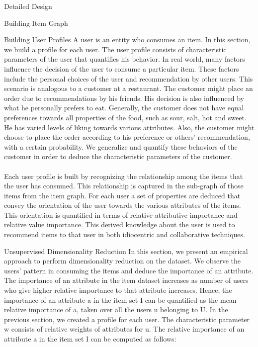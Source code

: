 \documentclass{report}
\begin{document}
\begin{projChapter}{Detailed Design}
\begin{projSection}{Building Item Graph}
\end{projSection}
\begin{projSection}{Building User Profiles}
            A user is an entity who consumes an item. In this section, we build a profile for each user. The user profile consists of characteristic parameters of the user that quantifies his behavior. In real world, many factors influence the decision of the user to consume a particular item. These factors include the personal choices of the user and recommendation by other users. This scenario is analogous to a customer at a restaurant. The customer might place an order due to recommendations by his friends. His decision is also influenced by what he personally prefers to eat. Generally, the customer does not have equal preferences towards all properties of the food, such as sour, salt, hot and sweet. He has varied levels of liking towards various attributes. Also, the customer might choose to place the order according to his preference or others' recommendation, with a certain probability. We generalize and quantify these behaviors of the customer in order to deduce the characteristic parameters of the customer. 
            ~\\\\
            Each user profile is built by recognizing the relationship among the items that the user has consumed. This relationship is captured in the sub-graph of those items from the item graph. For each user a set of properties are deduced that convey the orientation of the user towards the various attributes of the items. This orientation is quantified in terms of relative attributive importance and relative value importance. This derived knowledge about the user is used to recommend items to that user in both idiocentric and collaborative techniques.
        \end{projSection}
\begin{projSection}{Unsupervised Dimensionality Reduction}
            In this section, we present an empirical approach to perform dimensionality reduction on the dataset. We observe the users' pattern in consuming the items and deduce the importance of an attribute. The importance of an attribute in the item dataset increases as number of users who give higher relative importance to that attribute increases. Hence, the importance of an attribute a in the item set I can be quantified as the mean relative importance of a, taken over all the users u belonging to U. In the previous section, we created a profile for each user. The characteristic parameter w consists of relative weights of attributes for u. The relative importance of an attribute a in the item set I can be computed as follows:

\end{projSection}
\end{projChapter}
\end{document}
